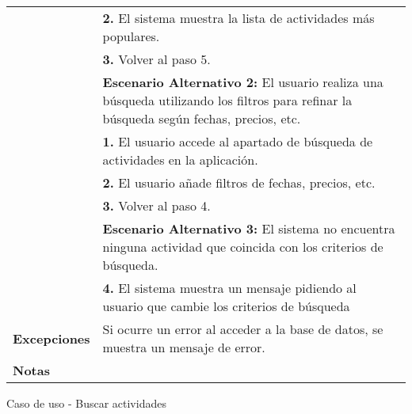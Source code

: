 \begin{analisisCasoDeUso}
\begin{tabular} { | m{3cm} | p{13cm} | }
		                            & {\bfseries 2.} El sistema muestra la lista de actividades más populares.                                                                         \\
		                            & {\bfseries 3.} Volver al paso 5.                                                                                                                 \\
		                            & {\bfseries Escenario Alternativo 2:} El usuario realiza una búsqueda utilizando los filtros para refinar la búsqueda según fechas, precios, etc. \\
		                            & {\bfseries 1.} El usuario accede al apartado de búsqueda de actividades en la aplicación.                                                        \\
		                            & {\bfseries 2.} El usuario añade filtros de fechas, precios, etc.                                                                                 \\
		                            & {\bfseries 3.} Volver al paso 4.                                                                                                                 \\
		                            & {\bfseries Escenario Alternativo 3:} El sistema no encuentra ninguna actividad que coincida con los criterios de búsqueda.                       \\
		                            & {\bfseries 4.} El sistema muestra un mensaje pidiendo al usuario que cambie los criterios de búsqueda                                            \\ \hline
		{\bfseries Excepciones}     & Si ocurre un error al acceder a la base de datos, se muestra un mensaje de error.                                                                \\ \hline
		{\bfseries Notas }          &                                                                                                                                                  \\ \hline
	\end{tabular}
	\caption{Caso de uso - Buscar actividades}
\end{analisisCasoDeUso}
